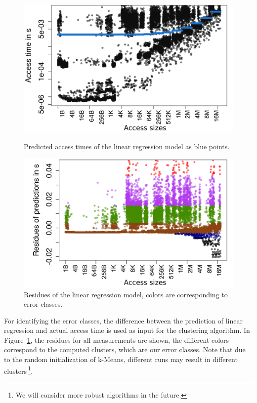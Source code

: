\documentclass{superfri}
\begin{document}
\begin{figure}[!h]
	\centering
	\begin{minipage}[b]{0.47\textwidth}
		\includegraphics[width=\textwidth]{src/plot_rnd_linreg_Size.png}
		\caption{Predicted access times of the linear regression model as blue points.}
		\label{linreg}
	\end{minipage}
	\hfill
	\begin{minipage}[b]{0.47\textwidth}
		\includegraphics[width=\textwidth]{src/linreg_error_clustering_rnd_all.png}
		\caption{Residues of the linear regression model, colors are corresponding to error classes.}
		\label{clustering}
	\end{minipage}
\end{figure}

For identifying the error classes, the difference between the prediction of linear regression and actual access time is used as input for the clustering algorithm.
In Figure~\ref{clustering}, the residues for all measurements are shown, the different colors correspond to the computed clusters, which are our error classes. 
Note that due to the random initialization of k-Means, different runs may result in different clusters\,\footnote{We will consider more robust algorithms in the future.}.
\end{document}

